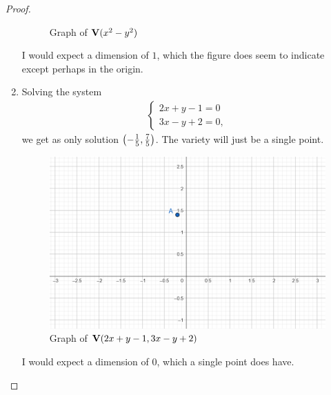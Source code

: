 \begin{proof}
\begin{enumerate}
\begin{figure}[H]
            \caption{Graph of $\mathbf{V}(x^2 - y^2)$}
            \label{fig:sec1-2-ex1b}
        \end{figure}
        I would expect a dimension of $1$, which the figure does seem to indicate except perhaps in the origin.
        \item Solving the system
        \begin{align*}
            \left\{\begin{array}{l}
            2x + y - 1 = 0\\
            3x - y + 2 = 0,
        \end{array}\right.
        \end{align*}
        we get as only solution $\left( -\frac{1}{5},\frac{7}{5}\right)$. 
        The variety will just be a single point.
        \begin{figure}[H]
            \centering
            \includegraphics[width=0.5\linewidth]{cox-little-oshea/ch1/assets/sec1-2-ex1c.png}
            \caption{Graph of $\mathbf{V}(2x+y-1, 3x - y + 2)$}
            \label{fig:sec1-2-ex1c}
        \end{figure}
        I would expect a dimension of $0$, which a single point does have.
    \end{enumerate}
\end{proof}

